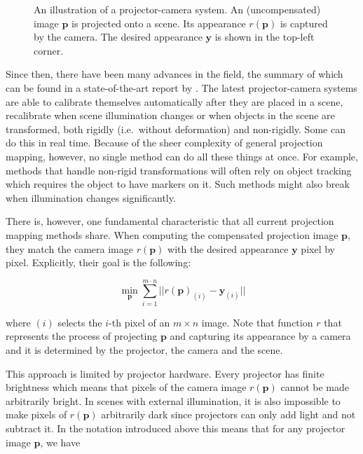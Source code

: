 \begin{figure}
    \centering
    \def\svgwidth{0.8\textwidth}
    
    \caption{An illustration of a projector-camera system. An (uncompensated) image \(\bm{p}\) is projected onto a scene. Its appearance \(r(\bm{p})\) is captured by the camera. The desired appearance \(\bm{y}\) is shown in the top-left corner.}
    \label{fig:intro_procam}
\end{figure}

Since then, there have been many advances in the field, the summary of which can be found in a state-of-the-art report by \citet{Grundhofer2018}. The latest projector-camera systems are able to calibrate themselves automatically after they are placed in a scene, recalibrate when scene illumination changes or when objects in the scene are transformed, both rigidly (i.e.~without deformation) and non-rigidly. Some can do this in real time. Because of the sheer complexity of general projection mapping, however, no single method can do all these things at once. For example, methods that handle non-rigid transformations will often rely on object tracking which requires the object to have markers on it. Such methods might also break when illumination changes significantly.

There is, however, one fundamental characteristic that all current projection mapping methods share. When computing the compensated projection image \(\bm{p}\), they match the camera image \(r(\bm{p})\) with the desired appearance \(\bm{y}\) pixel by pixel. Explicitly, their goal is the following:

\begin{equation}
    \label{eq:projection_mapping-per_pixel}
    \min_{\bm{p}} \sum_{i=1}^{m \cdot n} || r(\bm{p})_{(i)} - \bm{y}_{(i)} ||
\end{equation}

where \((i)\) selects the \(i\)-th pixel of an \(m \times n\) image. Note that function \(r\) that represents the process of projecting \(\bm{p}\) and capturing its appearance by a camera and it is determined by the projector, the camera and the scene.

This approach is limited by projector hardware. Every projector has finite brightness which means that pixels of the camera image \(r(\bm{p})\) cannot be made arbitrarily bright. In scenes with external illumination, it is also impossible to make pixels of \(r(\bm{p})\) arbitrarily dark since projectors can only add light and not subtract it. In the notation introduced above this means that for any projector image \(\bm{p}\), we have

